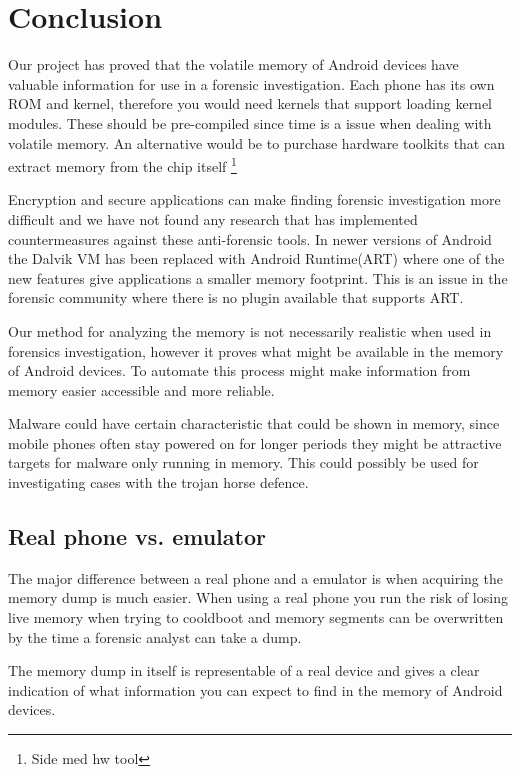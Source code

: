 \section{Conclusion}
Our project has proved that the volatile memory of Android devices have valuable information for use 
in a forensic investigation. %
Each phone has its own ROM and kernel, therefore you would need kernels that support loading kernel 
modules. These should be pre-compiled since time is a issue when dealing with volatile memory. An 
alternative would be to purchase hardware toolkits that can extract memory from the chip itself 
\footnote{Side med hw tool} %

Encryption and secure applications can make finding forensic investigation more difficult and we have not found 
any research that has implemented countermeasures against these anti-forensic tools. In newer versions 
of Android the Dalvik VM has been replaced with Android Runtime(ART) where one of the new 
features give applications a smaller memory footprint. This is an issue in the forensic community where there is no 
plugin available that supports ART.

Our method for analyzing the memory is not necessarily realistic when used in forensics investigation, 
however it proves what might be available in the memory of Android devices. 
To automate this process might make information from memory easier accessible and more reliable.

Malware could have certain characteristic that could be shown in memory, since mobile phones often stay 
powered on for longer periods they might be attractive targets for malware only running in memory. 
This could possibly be used for investigating cases with the trojan horse defence.

\subsection{Real phone vs. emulator}
The major difference between a real phone and a emulator is when acquiring the memory dump is much 
easier. When using a real phone you run the risk of losing live memory when trying to cooldboot and 
memory segments can be overwritten by the time a forensic analyst can take a dump.

The memory dump in itself is representable of a real device and gives a clear indication of what 
information you can expect to find in the memory of Android devices.





